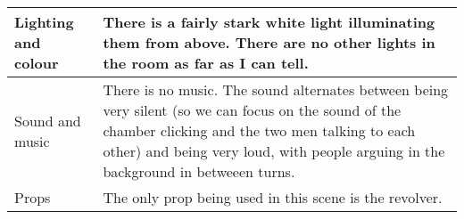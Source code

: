 \documentclass[notitlepage]{fhnwreport}
\begin{document}
\begin{center}
\begin{threeparttable}
\begin{tabular}{p{4.2cm}p{11cm}}
		\midrule
		Lighting and colour &

There is a fairly stark white light illuminating them from above. There are no
other lights in the room as far as I can tell. \\

		\midrule
		Sound and music &

There is no music. The sound alternates between being very  silent  (so we can
focus on the sound of  the  chamber  clicking  and the two men talking to each
other) and being very loud, with  people arguing in the background in betweeen
turns.\\

        \midrule
		Props &

The only prop being used in this scene is the revolver. \\

		\midrule
	\end{tabular}
\end{threeparttable}
\end{center}
\end{document}
